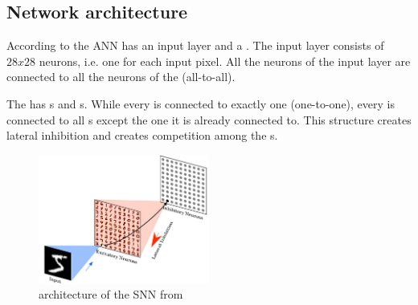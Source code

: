 \subsection{Network architecture}
\label{subsec:architecture}


According to \cite{SNN} the \ac{ANN} has an input layer and a \pLayer{}.
The input layer consists of $28 x 28$ neurons, i.e. one for each input pixel.
All the neurons of the input layer are connected to all the neurons of the \pLayer{} (all-to-all).

The \pLayer{} has \eN{}s and \iN{}s.
While every \eN{} is connected to exactly one \iN{} (one-to-one), every \iN{} is connected to all \eN{}s except the one it is already connected to.
This structure creates lateral inhibition and creates competition among the \eN{}s.

\begin{figure}[htbp]
    \center
    \includegraphics[width=0.5\textwidth]{pictures/architecture_SNN_erste_Quelle.jpg}
    \caption{architecture of the \ac{SNN} from \cite{SNN}}
    \label{fig:architecture_SNN}
\end{figure}